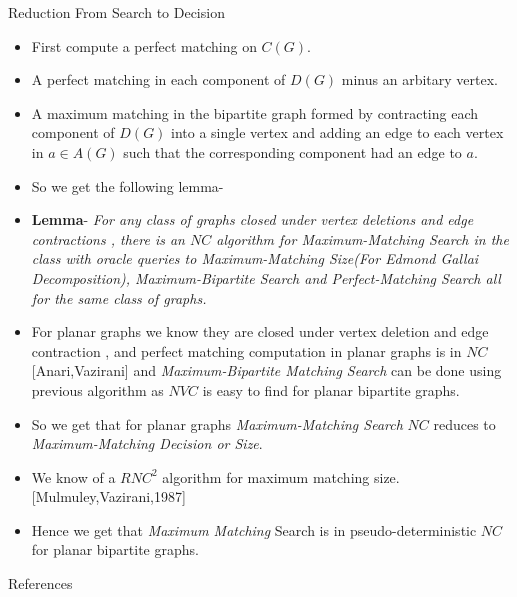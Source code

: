 \documentclass{beamer}
\begin{document}
\begin{frame}[allowframebreaks]{Reduction From Search to Decision}
\begin{itemize}
		\item First compute a perfect matching on $C(G)$.
		\item A perfect matching in each component of $D(G)$ minus an arbitary vertex.
		\item A maximum matching in the bipartite graph formed by contracting each component of $D(G)$ into a single vertex and adding an edge to each vertex in $a\in A(G)$ such that the corresponding  component had an edge to $a$.
		\item So we get the following lemma-
		\item \textbf{Lemma}- \textit{For any class of graphs closed under vertex deletions and edge contractions , there is an $NC$ algorithm for \textit{Maximum-Matching Search} in the class with oracle queries to \textit{Maximum-Matching Size}(For Edmond Gallai Decomposition), Maximum-Bipartite Search and Perfect-Matching Search all for the same class of graphs.}
		\item For planar graphs we know they are closed under vertex deletion and edge contraction , and perfect matching computation in planar graphs is in $NC$[Anari,Vazirani] and \textit{Maximum-Bipartite Matching Search} can be done using previous algorithm as $NVC $ is easy to find for planar bipartite graphs.
		\item So we get that for  planar graphs \textit{Maximum-Matching Search} $NC$ reduces to \textit{Maximum-Matching Decision or Size}.
		\item We know of a $RNC^2$ algorithm for maximum matching size.[Mulmuley,Vazirani,1987]
		\item Hence we get  that \textit{Maximum Matching} Search is in pseudo-deterministic  $NC$ for planar bipartite graphs.
	\end{itemize}

\end{frame}
	\begin{frame}[allowframebreaks]{References}
		
		\printbibliography[heading=none]
			
	\end{frame}
	
\end{document}
